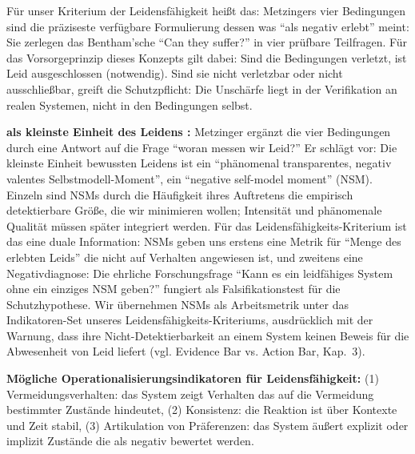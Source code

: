 \documentclass[acmlarge, noacm]{acmart}
\begin{document}
Für unser Kriterium der Leidensfähigkeit heißt das: Metzingers vier Bedingungen sind die präziseste verfügbare Formulierung dessen was ``als negativ erlebt'' meint: Sie zerlegen das Bentham'sche ``Can they suffer?'' in vier prüfbare Teilfragen. Für das Vorsorgeprinzip dieses Konzepts gilt dabei: Sind die Bedingungen verletzt, ist Leid ausgeschlossen (notwendig). Sind sie nicht verletzbar oder nicht ausschließbar, greift die Schutzpflicht: Die Unschärfe liegt in der Verifikation an realen Systemen, nicht in den Bedingungen selbst.

\textbf{ als kleinste Einheit des Leidens \cite{metzinger2021}:} Metzinger ergänzt die vier Bedingungen durch eine Antwort auf die Frage ``woran messen wir Leid?'' Er schlägt vor: Die kleinste Einheit bewussten Leidens ist ein ``phänomenal transparentes, negativ valentes Selbstmodell-Moment'', ein ``negative self-model moment'' (NSM). Einzeln sind NSMs durch die Häufigkeit ihres Auftretens die empirisch detektierbare Größe, die wir minimieren wollen; Intensität und phänomenale Qualität müssen später integriert werden. Für das Leidensfähigkeits-Kriterium ist das eine duale Information: NSMs geben uns erstens eine Metrik für ``Menge des erlebten Leids'' die nicht auf Verhalten angewiesen ist, und zweitens eine Negativdiagnose: Die ehrliche Forschungsfrage ``Kann es ein leidfähiges System ohne ein einziges NSM geben?'' fungiert als Falsifikationstest für die Schutzhypothese. Wir übernehmen NSMs als Arbeitsmetrik unter das Indikatoren-Set unseres Leidensfähigkeits-Kriteriums, ausdrücklich mit der Warnung, dass ihre Nicht-Detektierbarkeit an einem System keinen Beweis für die Abwesenheit von Leid liefert (vgl. Evidence Bar vs. Action Bar, Kap.~3).

\textbf{Mögliche Operationalisierungsindikatoren für Leidensfähigkeit:} (1) Vermeidungsverhalten: das System zeigt Verhalten das auf die Vermeidung bestimmter Zustände hindeutet, (2) Konsistenz: die Reaktion ist über Kontexte und Zeit stabil, (3) Artikulation von Präferenzen: das System äußert explizit oder implizit Zustände die als negativ bewertet werden.
\end{document}
